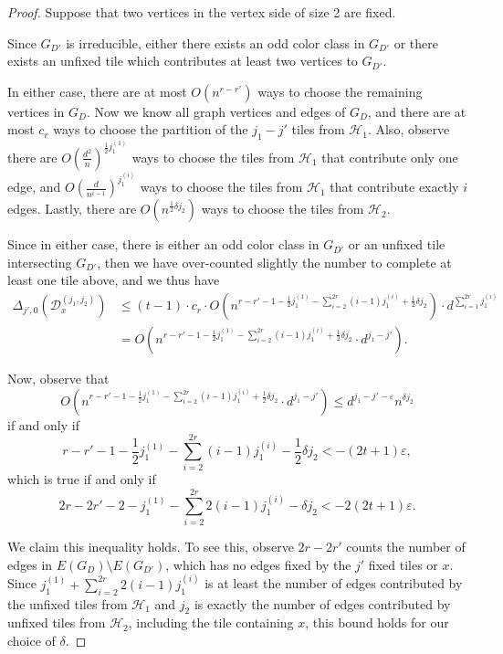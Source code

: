 \documentclass{article}
\theoremstyle{definition}
\newcommand\cH{{\mathcal H}}
\newcommand{\cD}{\mathcal{D}}
\begin{document}
\begin{proof}
    Suppose that two vertices in the vertex side of size 2 are fixed.  
    
    Since $G_{D'}$ is irreducible, either there exists an odd color class in $G_{D'}$ or there exists an unfixed tile which contributes at least two vertices to $G_{D'}$.

    
    In either case, there are at most $O \left(n^{r - r'} \right)$ ways to choose the remaining vertices in $G_
    D$.  Now we know all graph vertices and edges of $G_D$, and there are at most $c_r$ ways to choose the partition of the $j_1 - j'$ tiles from $\cH_1$.  Also, observe there are $O\left( \frac{d^2}{n} \right)^{\frac{1}{2} j_1^{(1)}}$ ways to choose the tiles from $\cH_1$ that contribute only one edge, and $O\left( \frac{d}{n^{i-1}} \right)^{j_1^{(i)}}$ ways to choose the tiles from $\cH_1$ that contribute exactly $i$ edges.  Lastly, there are $O(n^{\frac{1}{2} \delta j_2})$ ways to choose the tiles from $\cH_2$.  

    Since in either case, there is either an odd color class in $G_{D'}$ or an unfixed tile intersecting $G_{D'}$, then we have over-counted slightly the number to complete at least one tile above, and we thus have
    \begin{align*}
    \Delta_{j',0} \left( \cD_x^{(j_1,j_2)} \right) 
    &\leq (t-1) \cdot c_r \cdot  O \left( n^{r - r' - 1 - \frac{1}{2} j_1^{(1)} - \sum_{i=2}^{2r} (i-1) j_1^{(i)} + \frac{1}{2} \delta j_2} \right) \cdot d^{\sum_{i=1}^{2r} j_1^{(i)}} \\
    &= O \left( n^{r - r' - 1 - \frac{1}{2} j_1^{(1)} - \sum_{i=2}^{2r} (i-1) j_1^{(i)} + \frac{1}{2} \delta j_2} \cdot d^{j_1 - j'} \right).
\end{align*}

Now, observe that 
$$
    O \left( n^{r - r' - 1 - \frac{1}{2} j_1^{(1)} - \sum_{i=2}^{2r} (i-1) j_1^{(i)} + \frac{1}{2} \delta j_2} \cdot d^{j_1 - j'} \right) 
    \leq d^{j_1 - j' - \varepsilon} n^{\delta j_2}
$$
if and only if 
$$
    r - r' - 1 - \frac{1}{2} j_1^{(1)} - \sum_{i=2}^{2r} (i-1) j_1^{(i)} - \frac{1}{2} \delta j_2 < -(2t+1) \varepsilon,
$$
which is true if and only if
$$
    2r - 2r' - 2 - j_1^{(1)} - \sum_{i=2}^{2r} 2 (i-1) j_1^{(i)} - \delta j_2 < - 2(2t+1) \varepsilon. 
$$

We claim this inequality holds.  To see this, observe $2r - 2r'$ counts the number of edges in $E(G_D)\setminus E(G_{D'})$, which has no edges fixed by the $j'$ fixed tiles or $x$. Since $j_1^{(1)} + \sum_{i=2}^{2r} 2 (i-1) j_1^{(i)}$ is at least the number of edges contributed by the unfixed tiles from $\cH_1$ and $j_2$ is exactly the number of edges contributed by unfixed tiles from $\cH_2$, including the tile containing $x$, this bound holds for our choice of $\delta$.
\end{proof}
\end{document}
